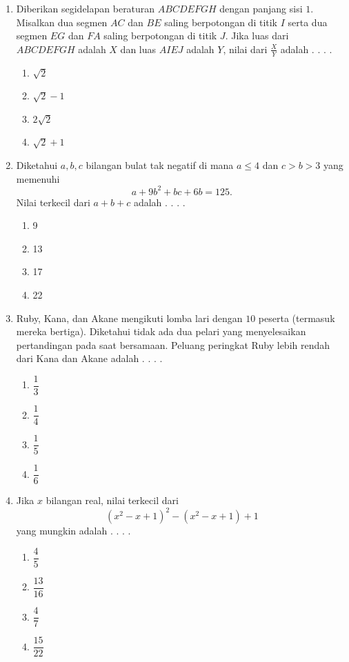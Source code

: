 \documentclass[12pt]{scrartcl}
\begin{document}
\begin{enumerate}
    \item Diberikan segidelapan beraturan $ABCDEFGH$ dengan panjang sisi $1$. Misalkan dua segmen $AC$ dan $BE$ saling berpotongan di titik $I$ serta dua segmen $EG$ dan $FA$ saling berpotongan di titik $J$. Jika luas dari $ABCDEFGH$ adalah $X$ dan luas $AIEJ$ adalah $Y$, nilai dari $\frac{X}{Y}$ adalah . . . .
    \begin{enumerate}[label={(\Alph*)}]
        \item $\sqrt{2}$ \item $\sqrt{2}-1$ \item $2\sqrt{2}$ \item $\sqrt{2}+1$
    \end{enumerate}

    \item Diketahui $a,b,c$ bilangan bulat tak negatif di mana $a\le 4$ dan $c>b>3$ yang memenuhi
    $$a+9b^2  + bc+6b= 125.$$
    Nilai terkecil dari $a+b+c$ adalah . . . .
    \begin{enumerate}[label={(\Alph*)}]
        \item 9 \item 13 \item 17 \item 22
    \end{enumerate}

    \item Ruby, Kana, dan Akane mengikuti lomba lari dengan $10$ peserta (termasuk mereka bertiga). Diketahui tidak ada dua pelari yang menyelesaikan pertandingan pada saat bersamaan. Peluang peringkat Ruby lebih rendah dari Kana dan Akane adalah . . . .
    \begin{enumerate}[label={(\Alph*)}]
        \item $\dfrac{1}{3}$ \item $\dfrac{1}{4}$ \item $\dfrac{1}{5}$ \item $\dfrac{1}{6}$
    \end{enumerate}

    \item Jika $x$ bilangan real, nilai terkecil dari
    $$\left (x^2-x+1\right )^2 -\left (x^2-x+1\right )+1$$
    yang mungkin adalah . . . .
    \begin{enumerate}[label={(\Alph*)}]
        \item $\dfrac{4}{5}$ \item $\dfrac{13}{16}$ \item $\dfrac{4}{7}$ \item $\dfrac{15}{22}$
    \end{enumerate}


\end{enumerate}
\end{document}
